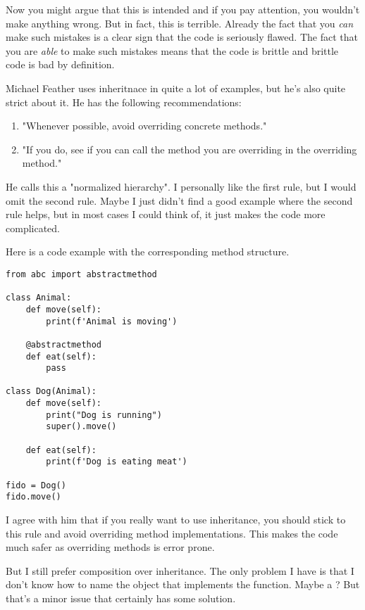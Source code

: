 Now you might argue that this is intended and if you pay attention, you wouldn't make anything wrong. But in fact, this is terrible. Already the fact that you \textit{can} make such mistakes is a clear sign that the code is seriously flawed. The fact that you are \textit{able} to make such mistakes means that the code is brittle and brittle code is bad by definition.

Michael Feather uses inheritnace in quite a lot of examples, but he's also quite strict about it. He has the following recommendations:

\begin{enumerate}
    \item "Whenever possible, avoid overriding concrete methods."
    \item "If you do, see if you can call the method you are overriding in the overriding method."
\end{enumerate}

He calls this a "normalized hierarchy".  I personally like the first rule, but I would omit the second rule. Maybe I just didn't find a good example where the second rule helps, but in most cases I could think of, it just makes the code more complicated.

Here is a code example with the corresponding method structure.

\begin{programcode}{}
\begin{verbatim}
from abc import abstractmethod

class Animal:
    def move(self):
        print(f'Animal is moving')

    @abstractmethod
    def eat(self):
        pass

class Dog(Animal):
    def move(self):
        print("Dog is running")
        super().move()

    def eat(self):
        print(f'Dog is eating meat')

fido = Dog()
fido.move()
\end{verbatim}
\end{programcode}

I agree with him that if you really want to use inheritance, you should stick to this rule and avoid overriding method implementations. This makes the code much safer as overriding methods is error prone.

But I still prefer composition over inheritance. The only problem I have is that I don't know how to name the object that implements the  function. Maybe a ? But that's a minor issue that certainly has some solution.

